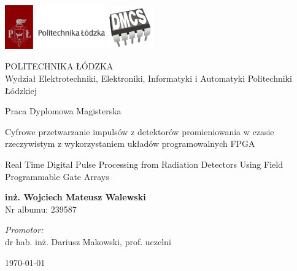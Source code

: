 \begin{titlepage}

\includegraphics[width=4.3cm]{media/unilogo.png}
\hspace{\fill}
\includegraphics[width=2cm]{media/faculty.jpg}

\begin{center}
POLITECHNIKA ŁÓDZKA \\
Wydział Elektrotechniki, Elektroniki, Informatyki i Automatyki Politechniki Łódzkiej
\end{center}

\vspace{32px}

\begin{center}
{\Large Praca Dyplomowa Magisterska}

\vspace{24px}

{\LARGE Cyfrowe przetwarzanie impulsów z detektorów promieniowania w czasie rzeczywistym z wykorzystaniem układów programowalnych FPGA}


{\LARGE Real Time Digital Pulse Processing from Radiation Detectors Using Field Programmable Gate Arrays}

\vspace{32px}

{ \bfseries inż. Wojciech Mateusz Walewski } \\
Nr albumu: 239587

\vspace{48px}

\begin{minipage}{0.8\textwidth}
\begin{flushright} 
\emph{Promotor:} \\
dr hab. inż. Dariusz Makowski, prof. uczelni\\
\end{flushright}
\end{minipage}

\vfill


{\today}


\end{center}
\end{titlepage}

